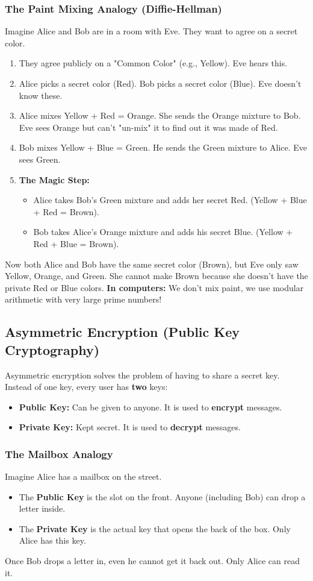 \documentclass[11pt,a4paper]{report}
\begin{document}
\subsubsection{The Paint Mixing Analogy (Diffie-Hellman)}
Imagine Alice and Bob are in a room with Eve. They want to agree on a secret color.
\begin{enumerate}
    \item They agree publicly on a "Common Color" (e.g., Yellow). Eve hears this.
    \item Alice picks a secret color (Red). Bob picks a secret color (Blue). Eve doesn't know these.
    \item Alice mixes Yellow + Red = Orange. She sends the Orange mixture to Bob. Eve sees Orange but can't "un-mix" it to find out it was made of Red.
    \item Bob mixes Yellow + Blue = Green. He sends the Green mixture to Alice. Eve sees Green.
    \item \textbf{The Magic Step:}
    \begin{itemize}
        \item Alice takes Bob's Green mixture and adds her secret Red. (Yellow + Blue + Red = Brown).
        \item Bob takes Alice's Orange mixture and adds his secret Blue. (Yellow + Red + Blue = Brown).
    \end{itemize}
\end{enumerate}
Now both Alice and Bob have the same secret color (Brown), but Eve only saw Yellow, Orange, and Green. She cannot make Brown because she doesn't have the private Red or Blue colors.
\textbf{In computers:} We don't mix paint, we use modular arithmetic with very large prime numbers!

\subsection{Asymmetric Encryption (Public Key Cryptography)}
Asymmetric encryption solves the problem of having to share a secret key. Instead of one key, every user has \textbf{two} keys:
\begin{itemize}
    \item \textbf{Public Key:} Can be given to anyone. It is used to \textbf{encrypt} messages.
    \item \textbf{Private Key:} Kept secret. It is used to \textbf{decrypt} messages.
\end{itemize}

\subsubsection{The Mailbox Analogy}
Imagine Alice has a mailbox on the street.
\begin{itemize}
    \item The \textbf{Public Key} is the slot on the front. Anyone (including Bob) can drop a letter inside.
    \item The \textbf{Private Key} is the actual key that opens the back of the box. Only Alice has this key.
\end{itemize}
Once Bob drops a letter in, even he cannot get it back out. Only Alice can read it.
\end{document}
